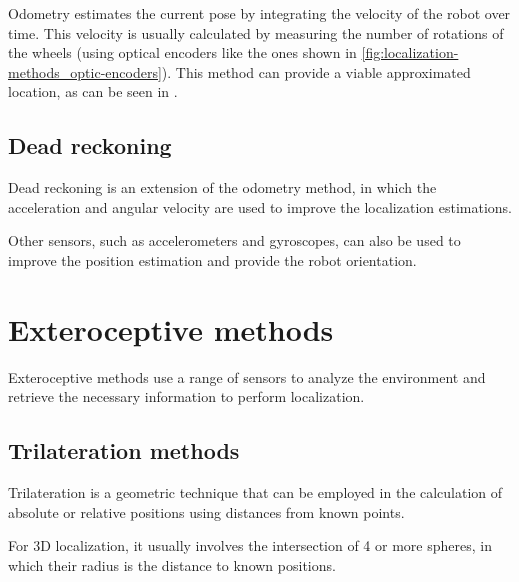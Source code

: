 Odometry estimates the current pose by integrating the velocity of the robot over time. This velocity is usually calculated by measuring the number of rotations of the wheels (using optical encoders like the ones shown in \cref{fig:localization-methods_optic-encoders}). This method can provide a viable approximated location, as can be seen in \cite{Reinstein2013}.



\subsection{Dead reckoning}

Dead reckoning is an extension of the odometry method, in which the acceleration and angular velocity are used to improve the localization estimations.

Other sensors, such as accelerometers and gyroscopes, can also be used to improve the position estimation \cite{Ibraheem2010} and provide the robot orientation.



\section{Exteroceptive methods}

Exteroceptive methods use a range of sensors to analyze the environment and retrieve the necessary information to perform localization.


\subsection{Trilateration methods}

Trilateration is a geometric technique that can be employed in the calculation of absolute or relative positions using distances from known points.

For 3D localization, it usually involves the intersection of 4 or more spheres, in which their radius is the distance to known positions.


